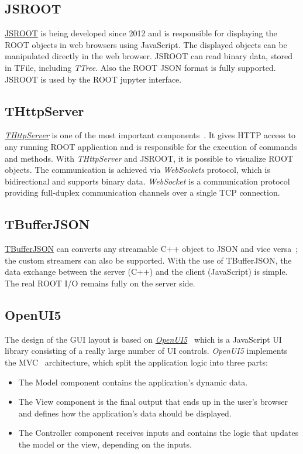 \documentclass[a4paper]{jpconf}
\begin{document}
\subsection{JSROOT}

\href{https://github.com/root-project/jsroot/}{JSROOT} is being developed since
2012 and is responsible for displaying the ROOT objects in web browsers using
JavaScript. The displayed objects can be manipulated directly in
the web browser. JSROOT can read binary data, stored in TFile, including \textit{TTree}.
Also the ROOT JSON format is fully supported. JSROOT is used by the ROOT jupyter\cite{jupyter} interface.

\subsection{THttpServer}

\href{https://github.com/root-project/jsroot/blob/master/docs/HttpServer.md}{{\it THttpServer}} is
one of the most important components~\cite{http}. It gives HTTP access to any running ROOT application
and is responsible for the execution of commands and methods. With {\it THttpServer}
and JSROOT, it is possible to visualize ROOT objects. The communication is achieved
via \textit{WebSockets} protocol, which is bidirectional and supports binary data. \textit{WebSocket}
is a communication protocol providing full-duplex communication channels over a
single TCP connection.

\subsection{TBufferJSON}

\href{https://root.cern/doc/master/classTBufferJSON.html}{TBufferJSON} can converts
any streamable C++ object to JSON and vice versa~\cite{buffer}; the custom streamers
can also be supported. With the use of TBufferJSON, the data exchange between the server (C++)
and the client (JavaScript) is simple. The real ROOT I/O remains fully on the server side.

\subsection{OpenUI5}
The design of the GUI layout is based on \textit{\href{https://openui5.hana.ondemand.com/}{OpenUI5}}~\cite{openui}
which is a JavaScript UI library consisting of a really large number of UI controls.
\textit{OpenUI5} implements the MVC~\cite{mvc} architecture, which split
the application logic into three parts:
\begin{itemize}
  \item The Model component contains the application's dynamic data.
  \item The View component is the final output that ends up in the user's browser and defines how the application's data should be displayed.
  \item The Controller component receives inputs and contains the logic that updates the model or the view, depending on the inputs.
\end{itemize}
\end{document}
